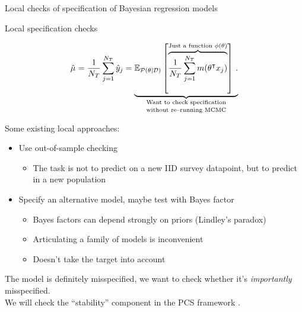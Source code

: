 

\begin{frame}[plain]
  \vfill
  \begin{block}{}
    \centering
    \Huge Local checks of specification of Bayesian regression models
  \end{block}
  \vfill
\end{frame}



\begin{frame}[t]{Local specification checks}

$$
\begin{aligned}
\muhatmrp = \meantar \yhat_j =
    \underbrace{
        \expect{\post}{
            \overbrace{
                {
                \meantar \m(\theta^\trans \x_j)
                }
            }^{
                \textrm{Just a function }\phi(\theta)
            }
        }.
    }_{\textrm{
        \shortstack{Want to check specification \\ without re--running MCMC}
    }}
\end{aligned}
$$


Some existing local approaches:
%
\begin{itemize}
%
\item Use out-of-sample checking \parencite{vehtariPracticalBayesianModel2017,gelman:2020:bayesianworkflow,kuhUsingLeaveoneoutCross2024}
\begin{itemize}
    \item The task is not to predict on a new IID survey datapoint, but to predict in a new population
\end{itemize}
%
\item Specify an alternative model, maybe test with Bayes factor
\parencite{dinoia:2025:LikelihoodDistortionBayesian2025,cabral:2025:RobustnessModelChecking2025}
%
\begin{itemize}
    \item Bayes factors can depend strongly on priors (Lindley's paradox)
    \item Articulating a family of models is inconvenient
    \item Doesn't take the target into account
\end{itemize}
%
\end{itemize}

\pause
The model is definitely misspecified, we want to check whether it's \emph{importantly} misspecified.\\[1em]
We will check the ``stability'' component in the PCS framework \parencite{yu:2024:veridical}.

\end{frame}

